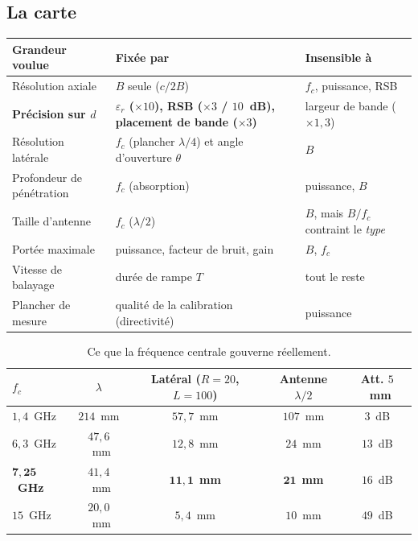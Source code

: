 \documentclass[11pt,a4paper]{article}
\newcommand{\eps}{\varepsilon_r}
\begin{document}
\subsection{La carte}

\begin{table}[h]
\centering
\begin{tabular}{>{\raggedright\arraybackslash}p{3.9cm}%
                >{\raggedright\arraybackslash}p{6.4cm}%
                >{\raggedright\arraybackslash}p{4.3cm}}
\toprule
Grandeur voulue & Fixée par & Insensible à \\
\midrule
Résolution axiale & $B$ seule ($c/2B$) & $f_c$, puissance, RSB \\[1mm]
\textbf{Précision sur $d$} & \textbf{$\eps$ ($\times 10$), RSB
  ($\times 3$ / $10$~dB), placement de bande ($\times 3$)}
  & largeur de bande ($\times 1{,}3$) \\[1mm]
Résolution latérale & $f_c$ (plancher $\lambda/4$) et angle d'ouverture
  $\theta$ & $B$ \\[1mm]
Profondeur de pénétration & $f_c$ (absorption) & puissance, $B$ \\[1mm]
Taille d'antenne & $f_c$ ($\lambda/2$) & $B$, mais $B/f_c$ contraint le
  \emph{type} \\[1mm]
Portée maximale & puissance, facteur de bruit, gain & $B$, $f_c$ \\[1mm]
Vitesse de balayage & durée de rampe $T$ & tout le reste \\[1mm]
Plancher de mesure & qualité de la calibration (directivité) & puissance \\
\bottomrule
\end{tabular}
\end{table}

\begin{table}[h]
\centering
\caption{Ce que la fréquence centrale gouverne réellement.}
\begin{tabular}{lcccc}
\toprule
$f_c$ & $\lambda$ & Latéral ($R=20$, $L=100$) & Antenne $\lambda/2$
  & Att. $5$~mm \\
\midrule
$1{,}4$~GHz & $214$~mm & $57{,}7$~mm & $107$~mm & $3$~dB \\
$6{,}3$~GHz & $47{,}6$~mm & $12{,}8$~mm & $24$~mm & $13$~dB \\
$\mathbf{7{,}25}$~\textbf{GHz} & $41{,}4$~mm & $\mathbf{11{,}1}$~\textbf{mm}
  & $\mathbf{21}$~\textbf{mm} & $16$~dB \\
$15$~GHz & $20{,}0$~mm & $5{,}4$~mm & $10$~mm & $49$~dB \\
\bottomrule
\end{tabular}
\end{table}
\end{document}
